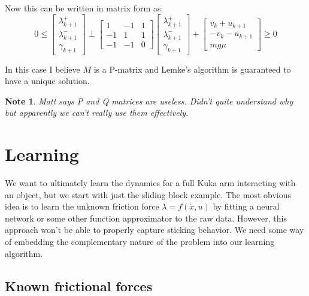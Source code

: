 \documentclass{article}
\newtheorem{note}{Note}
\begin{document}
Now this can be written in matrix form as:
\[
    0 \leq 
    \begin{bmatrix}
        \lambda^+_{k+1} \\
        \lambda^-_{k+1} \\
        \gamma_{k+1}
    \end{bmatrix}
    \perp
    \begin{bmatrix}
        1 & -1 & 1 \\
        -1 & 1 & 1 \\
        -1 & -1 & 0
    \end{bmatrix}
    \begin{bmatrix}
        \lambda^+_{k+1} \\
        \lambda^-_{k+1} \\
        \gamma_{k+1}
    \end{bmatrix}
    +
    \begin{bmatrix}
        v_k + u_{k+1} \\
        -v_k - u_{k+1} \\
        m g \mu
    \end{bmatrix}
    \geq 0
\]

In this case I believe $M$ is a P-matrix and Lemke's algorithm is guaranteed to have a unique solution.

\begin{note}
    Matt says P and Q matrices are useless. Didn't quite understand why but apparently we can't really use them effectively.
\end{note}

\section{Learning}
We want to ultimately learn the dynamics for a full Kuka arm interacting with an object, but we start with just the sliding block example. The most obvious idea is to learn the unknown friction force $\lambda = f(\dot x, u)$ by fitting a neural network or some other function approximator to the raw data. However, this approach won't be able to properly capture sticking behavior. We need some way of embedding the complementary nature of the problem into our learning algorithm. 

\subsection{Known frictional forces}
\end{document}
